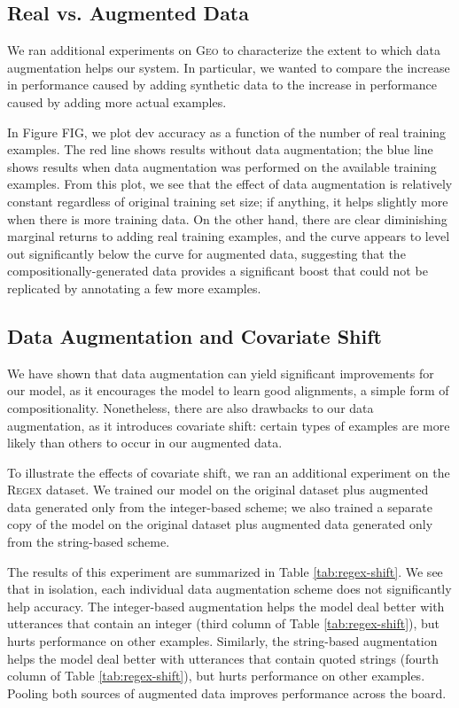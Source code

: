 \documentclass[11pt,letterpaper]{article}
\newcommand{\regex}{\textsc{Regex}\xspace}
\newcommand{\geo}{\textsc{Geo}\xspace}
\begin{document}
\subsection{Real vs. Augmented Data}
We ran additional experiments on \geo to characterize
the extent to which data augmentation helps our system.
In particular, we wanted to compare the increase in performance
caused by adding synthetic data to the 
increase in performance caused by adding more actual examples.

In Figure FIG, we plot dev accuracy as a function of
the number of real training examples.  The red line
shows results without data augmentation;
the blue line shows results when data augmentation was 
performed on the available training examples.
From this plot, we see that the effect of 
data augmentation is relatively constant regardless
of original training set size; if anything,
it helps slightly more when there is more training data.
On the other hand, there are clear diminishing marginal returns
to adding real training examples, and the curve appears to level out
significantly below the curve for augmented data,
suggesting that the compositionally-generated data
provides a significant boost that could not be replicated
by annotating a few more examples.

\subsection{Data Augmentation and Covariate Shift}
We have shown that data augmentation can yield significant improvements
for our model, as it encourages the model to learn good alignments,
a simple form of compositionality.  Nonetheless,
there are also drawbacks to our data augmentation, as it introduces
covariate shift: certain types of examples are more likely than others
to occur in our augmented data.

To illustrate the effects of covariate shift, we ran an additional
experiment on the \regex dataset.  We trained our model
on the original dataset plus augmented data generated only from the
integer-based scheme; we also trained a separate copy of the model
on the original dataset plus augmented data generated only from the
string-based scheme.  

The results of this experiment are summarized in Table \ref{tab:regex-shift}.
We see that in isolation, each individual data augmentation scheme
does not significantly help accuracy.
The integer-based augmentation helps the model deal better
with utterances that contain an integer 
(third column of Table \ref{tab:regex-shift}),
but hurts performance on other examples.
Similarly, the string-based augmentation helps the model
deal better with utterances that contain quoted strings 
(fourth column of Table \ref{tab:regex-shift}),
but hurts performance on other examples.
Pooling both sources of augmented data improves performance
across the board.
\end{document}
